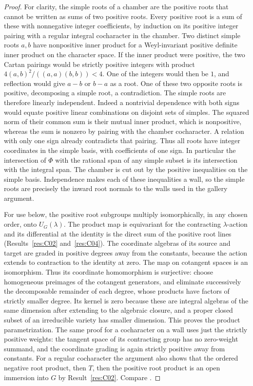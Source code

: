 \documentclass[11pt,a4paper,openany,oneside]{book}
\theoremstyle{resultstyle}
\theoremstyle{definition}
\numberwithin{equation}{chapter}
\begin{document}
\begin{proof}
For clarity, the simple roots of a chamber are the positive
roots that cannot be written as sums of two positive roots.
Every positive root is a sum of these with nonnegative integer
coefficients, by induction on its positive integer pairing with
a regular integral cocharacter in the chamber.
Two distinct simple roots \(a,b\) have nonpositive inner
product for a Weyl-invariant positive definite inner product
on the character space. If the inner product were positive,
the two Cartan pairings would be strictly positive integers
with product \(4(a,b)^2/((a,a)(b,b))<4\). One of the integers
would then be \(1\), and reflection would give \(a-b\) or
\(b-a\) as a root. One of these two opposite roots is positive,
decomposing a simple root, a contradiction.
The simple roots are therefore linearly independent.
Indeed a nontrivial dependence with both signs would equate
positive linear combinations on disjoint sets of simples.
The squared norm of their common sum is their mutual inner
product, which is nonpositive, whereas the sum is nonzero
by pairing with the chamber cocharacter. A relation with
only one sign already contradicts that pairing.
Thus all roots have integer coordinates in the simple basis,
with coefficients of one sign. In particular the intersection
of \(\Phi\) with the rational span of any simple subset is
its intersection with the integral span. The chamber is cut
out by the positive inequalities on the simple basis.
Independence makes each of these inequalities a wall, so
the simple roots are precisely the inward root normals to
the walls used in the gallery argument.

For use below, the positive root subgroups multiply
isomorphically, in any chosen order, onto \(U_G(\lambda)\).
The product map is equivariant for the contracting
\(\lambda\)-action and its differential at the identity is
the direct sum of the positive root lines
(Results~\ref{res:C02} and~\ref{res:C04}).
The coordinate algebras of its source and target are graded
in positive degrees away from the constants, because the
action extends to contraction to the identity at zero.
The map on cotangent spaces is an isomorphism.
Thus its coordinate homomorphism is surjective: choose
homogeneous preimages of the cotangent generators, and eliminate
successively the decomposable remainder of each degree,
whose products have factors of strictly smaller degree.
Its kernel is zero because these are integral algebras
of the same dimension after extending to the algebraic closure,
and a proper closed subset of an irreducible variety has
smaller dimension. This proves the product parametrization.
The same proof for a cocharacter on a wall uses just the
strictly positive weights: the tangent space of its contracting
group has no zero-weight summand, and the coordinate grading is
again strictly positive away from constants.
For a regular cocharacter the argument also shows that the ordered negative root product,
then \(T\), then the positive root product is an open
immersion into \(G\) by Result~\ref{res:C02}.
Compare \cite[Theorem 5.1.13]{conrad}.


\end{proof}
\end{document}
